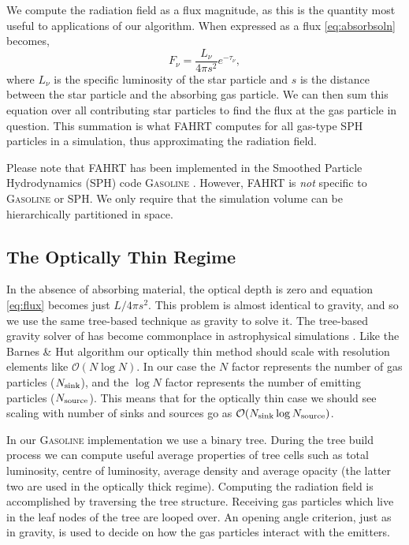 \documentclass[fleqn,usenatbib]{mnras}
\newcommand{\acro}{FAHRT}
\begin{document}
We compute the radiation field as a flux magnitude, as this is the quantity most
 useful to applications of our algorithm. When expressed as a flux 
\ref{eq:absorbsoln} becomes,
\begin{equation}
\label{eq:flux}
F_\nu = \frac{L_\nu}{4\pi s^2} e^{-\tau_\nu},
\end{equation}
where $L_\nu$ is the specific luminosity of the star particle and $s$ is the 
distance between the star particle and the absorbing gas particle. We can then 
sum this equation over all contributing star particles to find the flux at 
the gas particle in question. This summation is what \acro{} computes for all 
gas-type SPH particles in a simulation, thus approximating the radiation field.

Please note that \acro{} has been implemented in the Smoothed Particle 
Hydrodynamics (SPH) code \textsc{Gasoline} \citep{wadsleyEt03}. However, 
\acro{} is \emph{not} specific to \textsc{Gasoline} or SPH. We only require 
that the simulation volume can be hierarchically partitioned in space.

\subsection{The Optically Thin Regime}
In the absence of absorbing material, the optical depth is zero and equation 
\ref{eq:flux} becomes just $L/4\pi s^2$. This problem is almost identical to 
gravity, and so we use the same tree-based technique as gravity to solve it. 
The tree-based gravity solver of \citet{barnesHut86} has become commonplace in 
astrophysical simulations 
\citep{hubberEt11,wadsleyEt03,springelEt01,vineSigurdsson98,benz88}. Like the 
Barnes \& Hut algorithm our optically thin method should scale with resolution
 elements like $\mathcal{O}(N\log{N})$. In our case the $N$ factor represents 
the number of gas particles ($N_{\rm sink}$), and the $\log{N}$ factor 
represents the number of emitting particles ($N_{\rm source}$). This means that
for the optically thin case we should see scaling with number of sinks and 
sources go as $\mathcal{O}(N_{\rm sink} \log{N_{\rm source}})$. 

In our \textsc{Gasoline} implementation we use a binary tree. During the tree 
build process we can compute useful average properties of tree cells such as 
total luminosity, centre of luminosity, average density and average opacity 
(the latter two are used in the optically thick regime). Computing the 
radiation field is accomplished by traversing the tree structure. Receiving gas
 particles which live in the leaf nodes of the tree are looped over. An opening
 angle criterion, just as in gravity, is used to decide on how the gas 
particles interact with the emitters.
\end{document}
